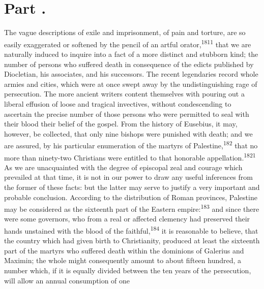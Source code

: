 

\section{Part \thesection.}

The vague descriptions of exile and imprisonment, of pain and
torture, are so easily exaggerated or softened by the pencil of
an artful orator,\textsuperscript{1811} that we are naturally induced to inquire
into a fact of a more distinct and stubborn kind; the number of
persons who suffered death in consequence of the edicts published
by Diocletian, his associates, and his successors. The recent
legendaries record whole armies and cities, which were at once
swept away by the undistinguishing rage of persecution. The more
ancient writers content themselves with pouring out a liberal
effusion of loose and tragical invectives, without condescending
to ascertain the precise number of those persons who were
permitted to seal with their blood their belief of the gospel.
From the history of Eusebius, it may, however, be collected, that
only nine bishops were punished with death; and we are assured,
by his particular enumeration of the martyrs of Palestine,\textsuperscript{182}
that no more than ninety-two Christians were entitled to that
honorable appellation.\textsuperscript{1821} As we are unacquainted with the
degree of episcopal zeal and courage which prevailed at that
time, it is not in our power to draw any useful inferences from
the former of these facts: but the latter may serve to justify a
very important and probable conclusion. According to the
distribution of Roman provinces, Palestine may be considered as
the sixteenth part of the Eastern empire:\textsuperscript{183} and since there
were some governors, who from a real or affected clemency had
preserved their hands unstained with the blood of the faithful,\textsuperscript{184}
it is reasonable to believe, that the country which had given
birth to Christianity, produced at least the sixteenth part of
the martyrs who suffered death within the dominions of Galerius
and Maximin; the whole might consequently amount to about fifteen
hundred, a number which, if it is equally divided between the ten
years of the persecution, will allow an annual consumption of one
